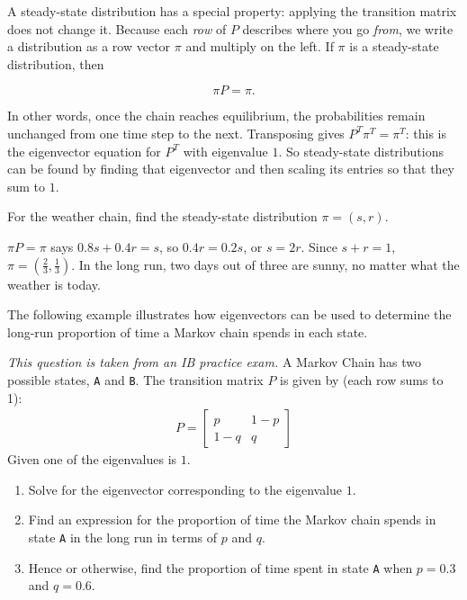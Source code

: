 A steady-state distribution has a special property: applying the transition matrix does not change it. Because each \emph{row} of $P$ describes where you go \emph{from}, we write a distribution as a row vector $\pi$ and multiply on the left. If $\pi$ is a steady-state distribution, then

\[
    \pi P = \pi.
\]

In other words, once the chain reaches equilibrium, the probabilities remain unchanged from one time step to the next. Transposing gives $P^T \pi^T = \pi^T$: this is the eigenvector equation for $P^T$ with eigenvalue $1$. So steady-state distributions can be found by finding that eigenvector and then scaling its entries so that they sum to $1$.

\begin{Worked}
\begin{Problem}
For the weather chain, find the steady-state distribution $\pi = (s, r)$.
\end{Problem}
\begin{Solution}
$\pi P = \pi$ says $0.8s + 0.4r = s$, so $0.4r = 0.2s$, or $s = 2r$. Since $s + r = 1$, $\pi = \left(\frac{2}{3}, \frac{1}{3}\right)$. In the long run, two days out of three are sunny, no matter what the weather is today.
\end{Solution}
\end{Worked}

The following example illustrates how eigenvectors can be used to determine the long-run proportion of time a Markov chain spends in each state.

\begin{Exercise}[title={Markov Chain in the form of Transition Matrix}, label={ex:transition_eigen}]
    \textit{This question is taken from an IB practice exam.}
    A Markov Chain has two possible states, \texttt{A} and \texttt{B}. The transition matrix $P$ is given by (each row sums to 1):
    $$\begin{array}{c} P=
            \begin{bmatrix}
                p & 1-p \\ 1-q & q
            \end{bmatrix}\end{array}$$
    Given one of the eigenvalues is $1$.
    \begin{enumerate}
        \item Solve for the eigenvector corresponding to the eigenvalue $1$.
        \item Find an expression for the proportion of time the Markov chain spends in state \texttt{A} in the long run in terms of $p$ and $q$.
        \item Hence or otherwise, find the proportion of time spent in state \texttt{A} when $p=0.3$ and $q=0.6$.
    \end{enumerate}
\end{Exercise}

